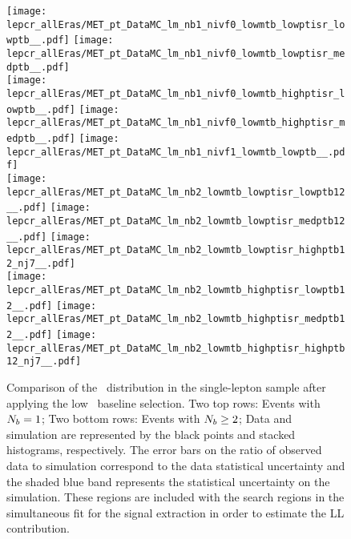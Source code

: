 \begin{figure}[!h]
	\begin{center}  
		\texttt{[image: lepcr\_allEras/MET\_pt\_DataMC\_lm\_nb1\_nivf0\_lowmtb\_lowptisr\_lowptb\_\_.pdf]}
		\texttt{[image: lepcr\_allEras/MET\_pt\_DataMC\_lm\_nb1\_nivf0\_lowmtb\_lowptisr\_medptb\_\_.pdf]} \\
		\texttt{[image: lepcr\_allEras/MET\_pt\_DataMC\_lm\_nb1\_nivf0\_lowmtb\_highptisr\_lowptb\_\_.pdf]}
		\texttt{[image: lepcr\_allEras/MET\_pt\_DataMC\_lm\_nb1\_nivf0\_lowmtb\_highptisr\_medptb\_\_.pdf]}
		\texttt{[image: lepcr\_allEras/MET\_pt\_DataMC\_lm\_nb1\_nivf1\_lowmtb\_lowptb\_\_.pdf]} \\
		\texttt{[image: lepcr\_allEras/MET\_pt\_DataMC\_lm\_nb2\_lowmtb\_lowptisr\_lowptb12\_\_.pdf]} 
		\texttt{[image: lepcr\_allEras/MET\_pt\_DataMC\_lm\_nb2\_lowmtb\_lowptisr\_medptb12\_\_.pdf]}
		\texttt{[image: lepcr\_allEras/MET\_pt\_DataMC\_lm\_nb2\_lowmtb\_lowptisr\_highptb12\_nj7\_\_.pdf]} \\
		\texttt{[image: lepcr\_allEras/MET\_pt\_DataMC\_lm\_nb2\_lowmtb\_highptisr\_lowptb12\_\_.pdf]} 
		\texttt{[image: lepcr\_allEras/MET\_pt\_DataMC\_lm\_nb2\_lowmtb\_highptisr\_medptb12\_\_.pdf]}
		\texttt{[image: lepcr\_allEras/MET\_pt\_DataMC\_lm\_nb2\_lowmtb\_highptisr\_highptb12\_nj7\_\_.pdf]} \\
	\end{center}
	\caption[Lost Lepton LM Control Region $\nb=1$]{Comparison of the \met~distribution in the single-lepton sample after applying the low \dm~baseline selection. Two top rows: Events with $\nb=1$; Two bottom rows: Events with $N_{b} \geq2$;  Data and simulation are represented by the black points and stacked histograms, respectively. The error bars on the ratio of observed data to simulation correspond to the data statistical uncertainty and the shaded blue band represents the statistical uncertainty on the simulation. These regions are included with the search regions in the simultaneous fit for the signal extraction in order to estimate the LL contribution.
	 }
	\label{fig:llb-1lcr-datavsmc-lm-nb1}
\end{figure}
